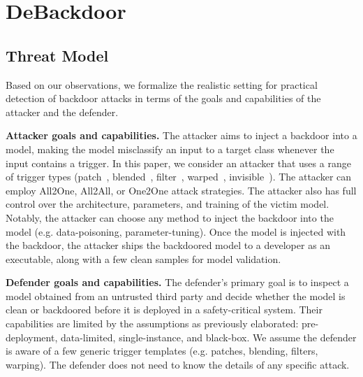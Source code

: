 \documentclass[letterpaper,twocolumn,10pt]{article}
\newcommand{\Z}{\textbf{DeBackdoor}}
\begin{document}
\section{\Z}
\label{sec:solution}

\subsection{Threat Model}
\label{sec:problem-definition}

Based on our observations, we formalize the realistic setting for practical detection of backdoor attacks in terms of the goals and capabilities of the attacker and the defender.

\textbf{Attacker goals and capabilities.} The attacker aims to inject a backdoor into a model, making the model misclassify an input to a target class whenever the input contains a trigger. In this paper, we consider an attacker that uses a range of trigger types (patch~\cite{gu2017badnets}, blended~\cite{chen2017targeted}, filter~\cite{fu2023eagle}, warped~\cite{nguyen2021wanet}, invisible~\cite{doan2021lira}). The attacker can employ All2One, All2All, or One2One attack strategies. The attacker also has full control over the architecture, parameters, and training of the victim model. Notably, the attacker can choose any method to inject the backdoor into the model (e.g. data-poisoning, parameter-tuning). Once the model is injected with the backdoor, the attacker ships the backdoored model to a developer as an executable, along with a few clean samples for model validation.

\textbf{Defender goals and capabilities.} The defender's primary goal is to inspect a model obtained from an untrusted third party and decide whether the model is clean or backdoored before it is deployed in a safety-critical system. Their capabilities are limited by the assumptions as previously elaborated: pre-deployment, data-limited, single-instance, and black-box. We assume the defender is aware of a few generic trigger templates (e.g. patches, blending, filters, warping). The defender does not need to know the details of any specific attack.
\end{document}
